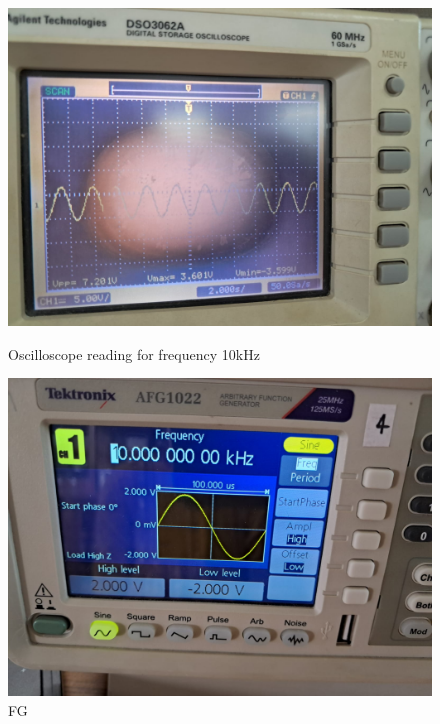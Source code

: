 \documentclass[a4paper,12pt]{article}
\begin{document}
\begin{figure}[H]
    \centering
    \begin{minipage}[b]{0.45\textwidth}
        \centering
        \includegraphics[width=\textwidth]{fig/bp/10ko.jpeg}
        \caption{Oscilloscope reading for frequency 10kHz}
    \end{minipage}
    \hfill
    \begin{minipage}[b]{0.45\textwidth}
        \centering
        \includegraphics[width=\textwidth]{fig/bp/10k.jpeg}
        \caption{FG}
    \end{minipage}
\end{figure}
\end{document}
